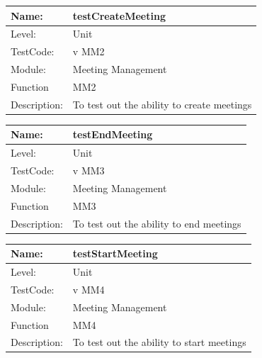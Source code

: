 \documentclass[12pt]{article}
\begin{document}
\begin{flushleft}
\begin{center}
\begin{tabular}{|l|p{12cm}|}
 Name: & testCreateMeeting  \\
\hline
Level: & Unit \\
\hline
TestCode: & v MM2 \\
\hline
Module:& Meeting Management \\
\hline
Function & MM2 \\
\hline
Description: & To test out the ability to create meetings \\
\hline

\end{tabular}
\end{center}

\begin{center}
\begin{tabular}{|l|p{12cm}|}
\hline

 Name: & testEndMeeting  \\
\hline
Level: & Unit \\
\hline
TestCode: & v MM3 \\
\hline
Module:& Meeting Management \\
\hline
Function & MM3 \\
\hline
Description: & To test out the ability to end meetings   \\
\hline

\end{tabular}
\end{center}

\begin{center}
\begin{tabular}{|l|p{12cm}|}
\hline

 Name: & testStartMeeting  \\
\hline
Level: & Unit \\
\hline
TestCode: & v MM4 \\
\hline
Module:& Meeting Management \\
\hline
Function & MM4 \\
\hline
Description: & To test out the ability to start meetings  \\
\hline

\end{tabular}
\end{center}

\begin{center}
\begin{tabular}{|l|p{12cm}|}
\hline


\end{tabular}
\end{center}
\end{flushleft}
\end{document}

